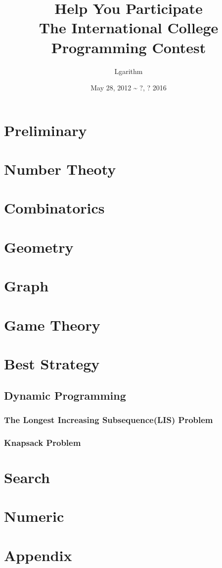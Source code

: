 \documentclass{book}
\date{May 28, 2012 \~{ } ?, ? 2016}
\title{{\Huge Help You Participate}\\
  {\large The International College Programming Contest}}
\author{Lgarithm}
\begin{document}
\maketitle
\tableofcontents
\chapter{Preliminary}

\chapter{Number Theoty}

\chapter{Combinatorics}

\chapter{Geometry}

\chapter{Graph}

\chapter{Game Theory}

\chapter{Best Strategy}
  \section{Dynamic Programming}
    \subsection{The Longest Increasing Subsequence(LIS) Problem}
    \subsection{Knapsack Problem}
\chapter{Search}

\chapter{Numeric}


\chapter*{Appendix}




\printindex
\end{document}
